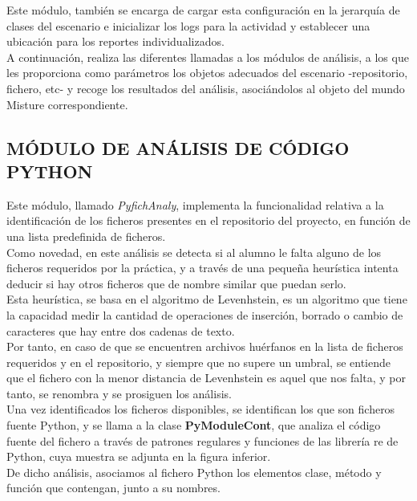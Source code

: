 Este módulo, también se encarga de cargar esta configuración en la jerarquía de clases del escenario e inicializar los logs para la actividad y establecer una ubicación para los reportes individualizados.\\


A continuación, realiza las diferentes llamadas a los módulos de análisis, a los que les proporciona como parámetros los objetos adecuados del escenario -repositorio, fichero, etc- y recoge los resultados del análisis, asociándolos al objeto del mundo Misture correspondiente.

\subsection{MÓDULO DE ANÁLISIS DE CÓDIGO PYTHON}

Este módulo, llamado \textit{PyfichAnaly}, implementa la funcionalidad relativa a la identificación de los ficheros presentes en el repositorio del proyecto, en función de una lista predefinida de ficheros.\\


Como novedad, en este análisis se detecta si al alumno le falta alguno de los ficheros requeridos por la práctica, y a través de una pequeña heurística intenta deducir si hay otros ficheros que de nombre similar que puedan serlo.\\


Esta heurística, se basa en el algoritmo de Levenhstein, es un algoritmo que tiene la capacidad medir la cantidad de operaciones de inserción, borrado o cambio de caracteres que hay entre dos cadenas de texto.\\


Por tanto, en caso de que se encuentren archivos huérfanos en la lista de ficheros requeridos y en el repositorio, y siempre que no supere un umbral, se entiende que el fichero con la menor distancia de Levenhstein es aquel que nos falta, y por tanto, se renombra y se prosiguen los análisis.\\


Una vez identificados los ficheros disponibles, se identifican los que son ficheros fuente Python, y se llama a la clase \textbf{PyModuleCont}, que analiza el código fuente del fichero a través de patrones regulares y funciones de las librería re de Python, cuya muestra se adjunta en la figura inferior.\\


De dicho análisis, asociamos al fichero Python los elementos clase, método y función que contengan, junto a su nombres.\\


